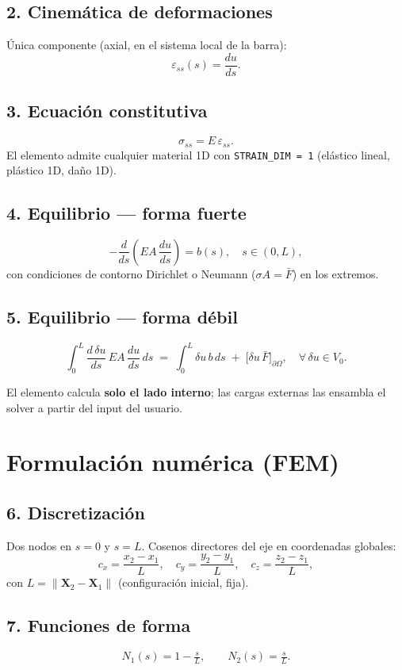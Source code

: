 \documentclass[11pt,letterpaper,oneside]{report}
\begin{document}
\subsection{2. Cinemática de deformaciones}
Única componente (axial, en el sistema local de la barra):
\[
\varepsilon_{ss}(s) = \frac{du}{ds}.
\]

\subsection{3. Ecuación constitutiva}
\[
\sigma_{ss} = E\,\varepsilon_{ss}.
\]
El elemento admite cualquier material 1D con \texttt{STRAIN\_DIM = 1} (elástico lineal, plástico 1D, daño 1D).

\subsection{4. Equilibrio --- forma fuerte}
\[
-\frac{d}{ds}\!\left(EA\,\frac{du}{ds}\right) = b(s), \quad s \in (0, L),
\]
con condiciones de contorno Dirichlet o Neumann ($\sigma A = \bar F$) en los extremos.

\subsection{5. Equilibrio --- forma débil}
\[
\int_0^L \frac{d\,\delta u}{ds}\,EA\,\frac{du}{ds}\,ds \;=\; \int_0^L \delta u\,b\,ds \;+\; \bigl[\delta u\,\bar F\bigr]_{\partial\Omega}, \quad \forall\,\delta u \in V_0.
\]

El elemento calcula \textbf{solo el lado interno}; las cargas externas las ensambla el solver a partir del input del usuario.


\section{Formulación numérica (FEM)}

\subsection{6. Discretización}
Dos nodos en $s = 0$ y $s = L$. Cosenos directores del eje en coordenadas globales:
\[
c_x = \frac{x_2 - x_1}{L}, \quad c_y = \frac{y_2 - y_1}{L}, \quad c_z = \frac{z_2 - z_1}{L},
\]
con $L = \|\mathbf X_2 - \mathbf X_1\|$ (configuración inicial, fija).

\subsection{7. Funciones de forma}
\[
N_1(s) = 1 - \tfrac{s}{L}, \qquad N_2(s) = \tfrac{s}{L}.
\]
\end{document}
